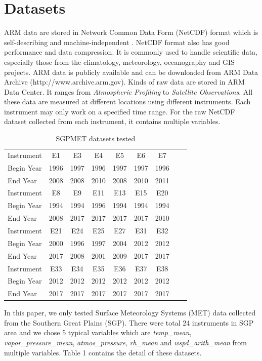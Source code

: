 \documentclass[letterpaper, 10 pt, conference]{ieeeconf}  %
\begin{document}
\section{Datasets}
ARM data are stored in Network Common Data Form (NetCDF) format which is self-describing and machine-independent \cite{rew1990netcdf, NetCDF}. NetCDF format also has good performance and data compression. It is commonly used to handle scientific data, especially those from the climatology, meteorology, oceanography and GIS projects. ARM data is publicly available and can be downloaded from ARM Data Archive (http://www.archive.arm.gov). Kinds of raw data are stored in ARM Data Center. It ranges from \textit{Atmospheric Profiling} to \textit{Satellite Observations}. All these data are measured at different locations using different instruments. Each instrument may only work on a specified time range. For the raw NetCDF dataset collected from each instrument, it contains multiple variables. 

\begin{table}[ht]
\caption{SGPMET datasets tested}
\label{tab:datasets}
\centering
\begin{tabular}{|l|c|c|c|c|c|c|c|c|}
\hline
Instrument & E1 & E3 & E4 & E5 & E6 & E7\\
Begin Year & 1996 & 1997 & 1996 & 1997 & 1997 & 1996\\
End Year & 2008 & 2008 & 2010 & 2008 & 2010 & 2011\\
\hline
Instrument & E8 & E9 & E11 & E13 & E15 & E20\\
Begin Year & 1994 & 1994 & 1996 & 1994 & 1994 & 1994\\
End Year & 2008 & 2017 & 2017 & 2017 & 2017 & 2010\\
\hline
Instrument & E21 & E24 & E25 & E27 & E31 & E32\\
Begin Year & 2000 & 1996 & 1997 & 2004 & 2012 & 2012\\
End Year & 2017 & 2008 & 2001 & 2009 & 2017 & 2017\\
\hline
Instrument & E33 & E34 & E35 & E36 & E37 & E38\\
Begin Year & 2012 & 2012 & 2012 & 2012 & 2012 & 2012\\
End Year & 2017 & 2017 & 2017 & 2017 & 2017 & 2017\\
\hline
\end{tabular}
\end{table}

In this paper, we only tested Surface Meteorology Systems (MET) data collected from the Southern Great Plains (SGP). There were total 24 instruments in SGP area and we chose 5 typical variables which are \textit{temp\_mean}, \textit{vapor\_pressure\_mean}, \textit{atmos\_pressure}, \textit{rh\_mean} and \textit{wspd\_arith\_mean} from multiple variables. Table 1 contains the detail of these datasets. 
\end{document}
